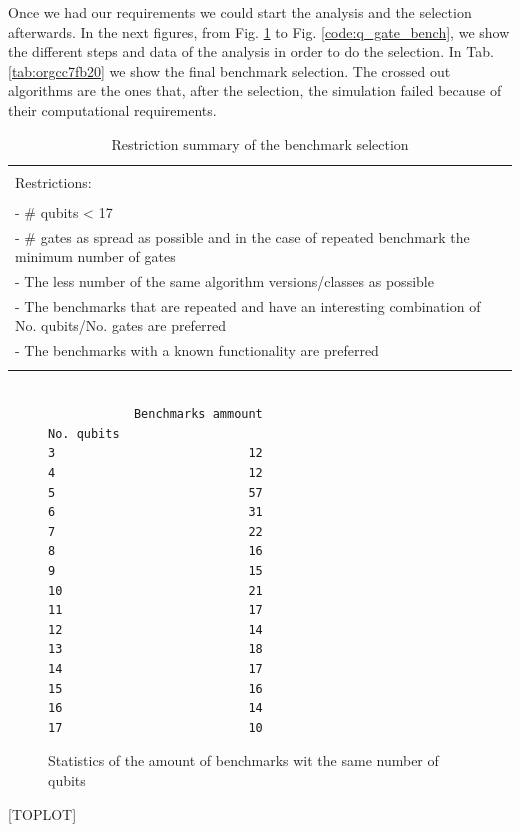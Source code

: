 Once we had our requirements we could start the analysis and the selection afterwards.
In the next figures, from Fig. \ref{code:no_q_statistics} to Fig. \ref{code:q_gate_bench}, we show the different steps and data of the analysis in order to do the selection.
In Tab. \ref{tab:orgcc7fb20} we show the final benchmark selection.
The crossed out algorithms are the ones that, after the selection, the simulation failed because of their computational requirements.
\begin{table}[htbp]
\caption{\label{tab:org8ad7673}
Restriction summary of the benchmark selection}
\centering
\begin{tabular}{|l|}
\hline
\\
Restrictions:\\
\\
- \# qubits < 17\\
- \# gates as spread as possible and in the case of repeated benchmark the minimum number of gates\\
- The less number of the same algorithm versions/classes as possible\\
- The benchmarks that are repeated and have an interesting combination of No. qubits/No. gates are  preferred\\
- The benchmarks with a known functionality are preferred\\
\\
\hline
\end{tabular}
\end{table}

\begin{figure}
\centering

\begin{verbatim}

            Benchmarks ammount
No. qubits
3                           12
4                           12
5                           57
6                           31
7                           22
8                           16
9                           15
10                          21
11                          17
12                          14
13                          18
14                          17
15                          16
16                          14
17                          10

\end{verbatim}


\label{code:no_q_statistics}
\caption{Statistics of the amount of benchmarks wit the same number of qubits}
\end{figure}
[TOPLOT]

